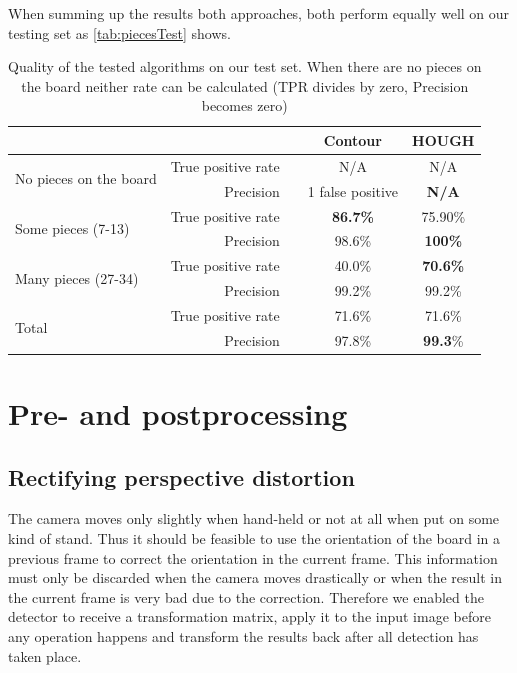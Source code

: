 	When summing up the results both approaches, both perform equally well on our testing set as \autoref{tab:piecesTest} shows.
	\begin{table}[b!]
		\begin{tabular}{lr ccc}
		    \multicolumn{2}{c}{}											 		&\hphantom{Abst} & Contour 	& HOUGH\\
			\toprule
			\multirow{2}{*}{No pieces on the board}   		& True positive rate 	&& N/A 		& N/A  \\
															& Precision			 	&& 1 false positive 		& \bf{N/A} \\
			\midrule
			\multirow{2}{*}{Some pieces (7-13)}				& True positive rate 	&& \bf{86.7\%} 	& 75.90\% \\
															& Precision 			&& 98.6\% 		& \bf{100\%} \\
			\midrule
			\multirow{2}{*}{Many pieces (27-34)} 			& True positive rate 	&& 40.0\% 		& \bf{70.6\%} \\
															& Precision			 	&& 99.2\% 		& 99.2\% \\
			\bottomrule
			\multirow{2}{*}{Total}				 			& True positive rate 	&& 71.6\% 		& 71.6\% \\
															& Precision			 	&& 97.8\% 		& \textbf{99.3}\% \\
			\bottomrule
		\end{tabular}
		\caption{Quality of the tested algorithms on our test set. When there are no pieces on the board neither rate can be calculated (TPR divides by zero, Precision becomes zero)}
		\label{tab:piecesTest}
	\end{table}


	\section{Pre- and postprocessing}
	\label{evaluation-prepostprocessing}

	\subsection{Rectifying perspective distortion}
	\label{evaluation-prepostprocessing-perspectiveRectifying}
	The camera moves only slightly when hand-held or not at all when put on some kind of stand. Thus it should be feasible to use the orientation of the board in a previous frame to correct the orientation in the current frame. This information must only be discarded when the camera moves drastically or when the result in the current frame is very bad due to the correction. Therefore we enabled the detector to receive a transformation matrix, apply it to the input image before any operation happens and transform the results back after all detection has taken place.

